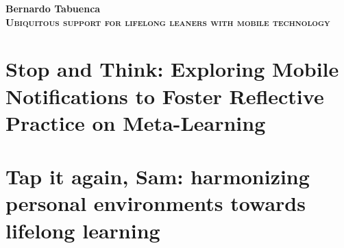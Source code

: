 \documentclass[a4paper,12pt,twoside,openright]{book}
\begin{document}
\nocite{*} %

\begin{titlepage}
	\null\vfill
	\center
		\Large
		\textbf{Bernardo Tabuenca}\\
		\vspace*{1em}
	\Huge
	\textbf{\textsc{Ubiquitous support for lifelong leaners with mobile technology}}\\
	\vfill\null
	
	\clearpage{\pagestyle{empty}\cleardoublepage}
\end{titlepage}
	
\frontmatter	
	\tableofcontents
	
	\cleardoublepage
	\listoffigures
	
	\cleardoublepage	
	\listoftables
	
	
	\clearpage{\pagestyle{empty}\cleardoublepage}
	\pagestyle{fancy}
	
\mainmatter
	
	
		\clearpage{\pagestyle{empty}\cleardoublepage}

%		
			
%		




	\part{Stop and Think: Exploring Mobile Notifications to Foster Reflective Practice on Meta-Learning}
		
			\clearpage{\pagestyle{empty}\cleardoublepage}				
						
	\part{Tap it again, Sam: harmonizing personal environments towards lifelong learning}
		
			\clearpage{\pagestyle{empty}\cleardoublepage}				
\end{document}
